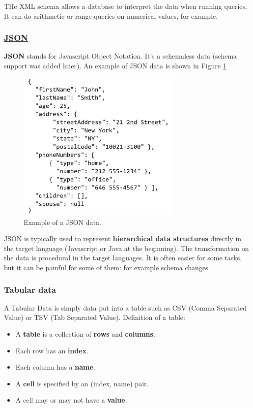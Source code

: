 THe XML schema allows a database to interpret the data when running queries. It can do arithmetic or range queries on numerical values, for example.

\subsubsection{\href{https://en.wikipedia.org/wiki/JSON}{JSON}}

{\bf JSON} stands for Javascript Object Notation. It's a schemaless data (schema support was added later). An example of JSON data is shown in Figure \ref{pic:json}

\begin{figure}[H]%
 \centering
 \includegraphics[width=8cm]{./img/04/json}
 \caption{\label{pic:json} Example of a JSON data.}
\end{figure}

JSON is typically used to represent {\bf hierarchical data structures} directly in the target language (Javascript or Java at the beginning). The transformation on the data is procedural in the target languages. It is often easier for some tasks, but it can be painful for some of them: for example schema changes.

\subsubsection{Tabular data}

A Tabular Data is simply data put into a table such as CSV (Comma Separated Value) or TSV (Tab Separated Value). Definition of a table:
\begin{itemize}
 \item A {\bf table} is a collection of {\bf rows} and {\bf columns}.
 \item Each row has an {\bf index}.
 \item Each column has a {\bf name}.
 \item A {\bf cell} is specified by an (index, name) pair.
 \item A cell may or may not have a {\bf value}.
\end{itemize}

